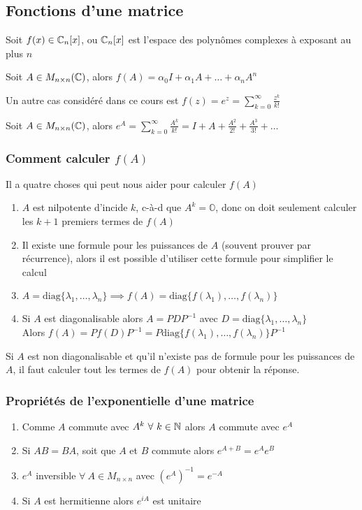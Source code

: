 \subsection{Fonctions d'une matrice}
Soit $f(x) \in \mathbb{C}_n[x]$, ou $\mathbb{C}_n[x]$ est l'espace des polynômes complexes à exposant au plus $n$
\begin{definition}
    Soit $A \in M_{n \times n}(\mathbb{C})$, alors $f(A) = \alpha_0 I + \alpha_1 A + \dots + \alpha_n A^n$
\end{definition}
Un autre cas considéré dans ce cours est $f(z) = e^z = \sum_{k = 0}^{\infty}\frac{z^k}{k!}$
\begin{definition}
    Soit $A \in M_{n \times n}(\mathbb{C})$, alors $e^A = \sum_{k = 0}^{\infty}\frac{A^k}{k!} = I + A + \frac{A^2}{2!} + \frac{A^3}{3!} + \dots$
\end{definition}

\subsubsection{Comment calculer \texorpdfstring{$f(A)$}{f(A)}}
Il a quatre choses qui peut nous aider pour calculer $f(A)$
\begin{enumerate}
    \item $A$ est nilpotente d'incide $k$, c-à-d que $A^k = \mathbb{O}$, donc on doit seulement 
    calculer les $k + 1$ premiers termes de $f(A)$
    \item Il existe une formule pour les puissances de $A$ (souvent prouver par récurrence),
    alors il est possible d'utiliser cette formule pour simplifier le calcul
    \item $A = \text{diag}\{\lambda_1, \dots, \lambda_n \} \implies f(A) = \text{diag}\{f(\lambda_1), \dots, f(\lambda_n)\}$
    \item Si $A$ est diagonalisable alors $A = PDP^{-1}$ avec $D = \text{diag}\{\lambda_1, \dots, \lambda_n\}$ \\
    Alors $f(A) = Pf(D)P^{-1} = P\text{diag}\{f(\lambda_1), \dots, f(\lambda_n)\}P^{-1}$
\end{enumerate}
\begin{remark}
    Si $A$ est non diagonalisable et qu'il n'existe pas de formule pour les puissances de $A$,
    il faut calculer tout les termes de $f(A)$ pour obtenir la réponse. 
\end{remark}

\subsubsection{Propriétés de l'exponentielle d'une matrice}
\begin{enumerate}
    \item Comme $A$ commute avec $A^k \ \forall \ k \in \mathbb{N}$ alors $A$ commute avec $e^A$
    \item Si $AB = BA$, soit que $A$ et $B$ commute alors $e^{A + B} = e^A e^B$
    \item $e^A$ inversible $\forall \ A \in M_{n \times n}$ avec $\left(e^A\right)^{-1} = e^{-A}$ 
    \item Si $A$ est hermitienne alors $e^{iA}$ est unitaire
\end{enumerate}